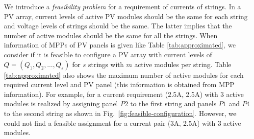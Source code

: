 \documentclass[conference]{IEEEtran}
\begin{document}
We introduce a \textit{feasibility problem} for a requirement of currents of strings. 
In a PV array, current levels of active PV modules should be the same for each string and voltage levels of strings should be the same. The latter implies that the number of active modules should be the same for all the strings. 
When information of MPPs of PV panels is given like Table \ref{tab:approximated}, we consider if it is feasible to configure a PV array with current levels of 
$Q = (Q_{1},Q_{2},\ldots ,Q_{s})$ for $s$ strings with $m$ active modules per string. 
Table \ref{tab:approximated} also shows the maximum number of active modules for each required current level and PV panel (this information is obtained from MPP information).
For example, for a current requirement (2.5A, 2.5A) with 3 active modules is realized by assigning panel $P2$ to the first string and panels $P1$ and $P4$ to the second string as shown in Fig.~\ref{fig:feasible-configuration}. However, we could not find a feasible assignment for a current pair (3A, 2.5A) with 3 active modules.



\end{document}

